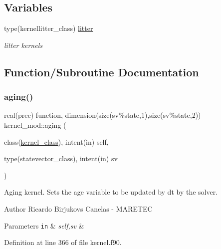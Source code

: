 \subsection*{Variables}
\begin{DoxyCompactItemize}
\item 
type(kernellitter\+\_\+class) \mbox{\hyperlink{namespacekernel__mod_a787f41bde87184610d6f926a6aaa704d}{litter}}
\begin{DoxyCompactList}\small\item\em litter kernels \end{DoxyCompactList}\end{DoxyCompactItemize}


\subsection{Function/\+Subroutine Documentation}
\mbox{\label{namespacekernel__mod_ac2352f3964b072607ed042e70a59b9f2}} 
\subsubsection{\texorpdfstring{aging()}{aging()}}
{\footnotesize\ttfamily real(prec) function, dimension(size(sv\%state,1),size(sv\%state,2)) kernel\+\_\+mod\+::aging (\begin{DoxyParamCaption}\item[{class(\mbox{\hyperlink{structkernel__mod_1_1kernel__class}{kernel\+\_\+class}}), intent(in)}]{self,  }\item[{type(statevector\+\_\+class), intent(in)}]{sv }\end{DoxyParamCaption})}



Aging kernel. Sets the age variable to be updated by dt by the solver. 

\begin{DoxyAuthor}{Author}
Ricardo Birjukovs Canelas -\/ M\+A\+R\+E\+T\+EC 
\end{DoxyAuthor}

\begin{DoxyParams}[1]{Parameters}
\mbox{\tt in}  & {\em self,sv} & \\
\hline
\end{DoxyParams}


Definition at line 366 of file kernel.\+f90.


